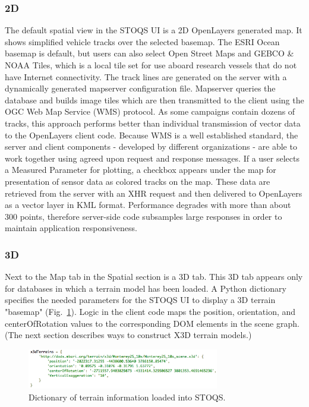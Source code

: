 \documentclass[conference]{IEEEtran}
\begin{document}
\subsubsection{2D}
The default spatial view in the STOQS UI is a 2D OpenLayers generated map. It shows simplified vehicle tracks over the selected basemap. The ESRI Ocean basemap is default, but users can also select Open Street Maps and GEBCO \& NOAA Tiles, which is a local tile set for use aboard research vessels that do not have Internet connectivity. The track lines are generated on the server with a dynamically generated mapserver configuration file. Mapserver queries the database and builds image tiles which are then transmitted to the client using the OGC Web Map Service (WMS) protocol. As some campaigns contain dozens of tracks, this approach performs better than individual transmission of vector data to the OpenLayers client code. Because WMS is a well established standard, the server and client components - developed by different organizations - are able to work together using agreed upon request and response messages. If a user selects a Measured Parameter for plotting, a checkbox appears under the map for presentation of sensor data as colored tracks on the map. These data are retrieved from the server with an XHR request and then delivered to OpenLayers as a vector layer in KML format. Performance degrades with more than about 300 points, therefore server-side code subsamples large responses in order to maintain application responsiveness.

\subsubsection{3D}
Next to the Map tab in the Spatial section is a 3D tab. This 3D tab appears only for databases in which a terrain model has been loaded. A Python dictionary specifies the needed parameters for the STOQS UI to display a 3D terrain "basemap" (Fig.~\ref{fig:x3dTerrains}). Logic in the client code maps the position, orientation, and centerOfRotation values to the corresponding DOM elements in the scene graph. (The next section describes ways to construct X3D terrain models.)

\begin{figure}[htbp]
\centering
\includegraphics[width=3.3in]{x3dTerrains.png}
\caption{Dictionary of terrain information loaded into STOQS.}
\label{fig:x3dTerrains}
\end{figure}
\end{document}
